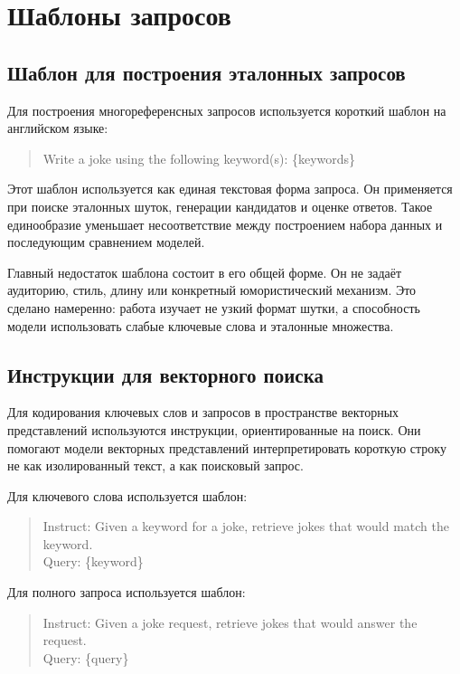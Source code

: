 \chapter{Шаблоны запросов}

\section{Шаблон для построения эталонных запросов}

Для построения многореференсных запросов используется короткий шаблон на английском языке:
\begin{quote}
    \ttfamily Write a joke using the following keyword(s): \{keywords\}
\end{quote}

Этот шаблон используется как единая текстовая форма запроса. Он применяется при поиске эталонных шуток, генерации кандидатов и оценке ответов. Такое единообразие уменьшает несоответствие между построением набора данных и последующим сравнением моделей.

Главный недостаток шаблона состоит в его общей форме. Он не задаёт аудиторию, стиль, длину или конкретный юмористический механизм. Это сделано намеренно: работа изучает не узкий формат шутки, а способность модели использовать слабые ключевые слова и эталонные множества.

\section{Инструкции для векторного поиска}

Для кодирования ключевых слов и запросов в пространстве векторных представлений используются инструкции, ориентированные на поиск. Они помогают модели векторных представлений интерпретировать короткую строку не как изолированный текст, а как поисковый запрос.

Для ключевого слова используется шаблон:
\begin{quote}
    \ttfamily Instruct: Given a keyword for a joke, retrieve jokes that would match the keyword.\\
    Query: \{keyword\}
\end{quote}

Для полного запроса используется шаблон:
\begin{quote}
    \ttfamily Instruct: Given a joke request, retrieve jokes that would answer the request.\\
    Query: \{query\}
\end{quote}

